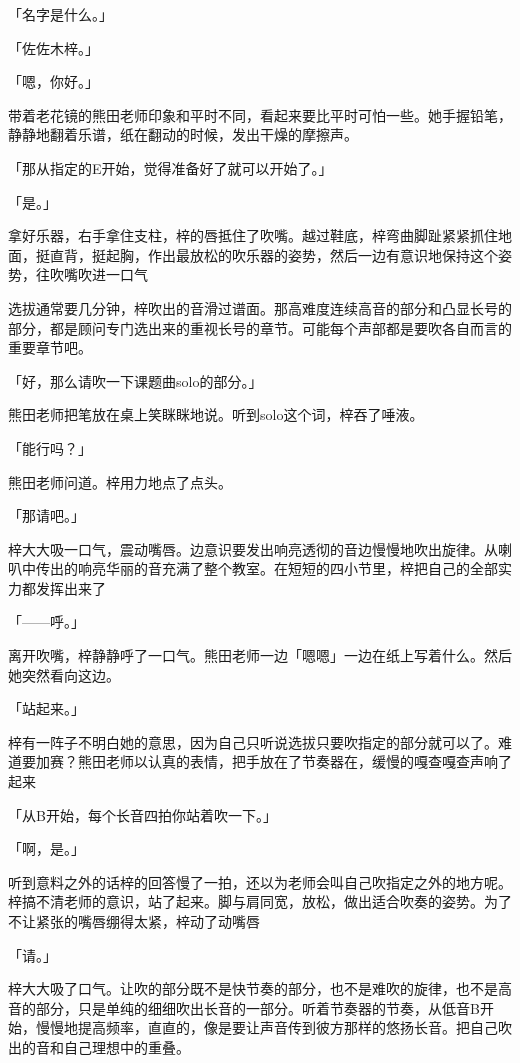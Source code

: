 \documentclass[UTF8]{ctexart}
\begin{document}
    「名字是什么。」

    「佐佐木梓。」

    「嗯，你好。」

    带着老花镜的熊田老师印象和平时不同，看起来要比平时可怕一些。她手握铅笔，静静地翻着乐谱，纸在翻动的时候，发出干燥的摩擦声。

    「那从指定的E开始，觉得准备好了就可以开始了。」

    「是。」

    拿好乐器，右手拿住支柱，梓的唇抵住了吹嘴。越过鞋底，梓弯曲脚趾紧紧抓住地面，挺直背，挺起胸，作出最放松的吹乐器的姿势，然后一边有意识地保持这个姿势，往吹嘴吹进一口气

    选拔通常要几分钟，梓吹出的音滑过谱面。那高难度连续高音的部分和凸显长号的部分，都是顾问专门选出来的重视长号的章节。可能每个声部都是要吹各自而言的重要章节吧。

    「好，那么请吹一下课题曲solo的部分。」

    熊田老师把笔放在桌上笑眯眯地说。听到solo这个词，梓吞了唾液。

    「能行吗？」

    熊田老师问道。梓用力地点了点头。

    「那请吧。」

    梓大大吸一口气，震动嘴唇。边意识要发出响亮透彻的音边慢慢地吹出旋律。从喇叭中传出的响亮华丽的音充满了整个教室。在短短的四小节里，梓把自己的全部实力都发挥出来了

    「——呼。」

    离开吹嘴，梓静静呼了一口气。熊田老师一边「嗯嗯」一边在纸上写着什么。然后她突然看向这边。

    「站起来。」

    梓有一阵子不明白她的意思，因为自己只听说选拔只要吹指定的部分就可以了。难道要加赛？熊田老师以认真的表情，把手放在了节奏器在，缓慢的嘎查嘎查声响了起来

    「从B开始，每个长音四拍你站着吹一下。」

    「啊，是。」

    听到意料之外的话梓的回答慢了一拍，还以为老师会叫自己吹指定之外的地方呢。梓搞不清老师的意识，站了起来。脚与肩同宽，放松，做出适合吹奏的姿势。为了不让紧张的嘴唇绷得太紧，梓动了动嘴唇

    「请。」

    梓大大吸了口气。让吹的部分既不是快节奏的部分，也不是难吹的旋律，也不是高音的部分，只是单纯的细细吹出长音的一部分。听着节奏器的节奏，从低音B开始，慢慢地提高频率，直直的，像是要让声音传到彼方那样的悠扬长音。把自己吹出的音和自己理想中的重叠。
\end{document}
